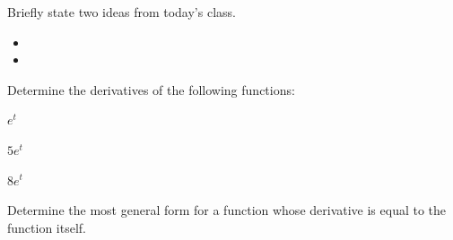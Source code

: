 \postClass

\begin{problem}
\item Briefly state two ideas from today's class.
  \begin{itemize}
  \item 
  \item 
  \end{itemize}
\item 
  \begin{subproblem}
    \item
  \end{subproblem}
\end{problem}


\begin{problem}
\item Determine the derivatives of the following functions:
  \begin{subproblem}
  \item $e^{t}$
    \vfill
  \item $5e^{t}$
    \vfill
  \item $8e^t$
    \vfill
  \end{subproblem}
\item Determine the most general form for a function whose derivative
  is equal to the function itself.
  \vfill
\end{problem}


